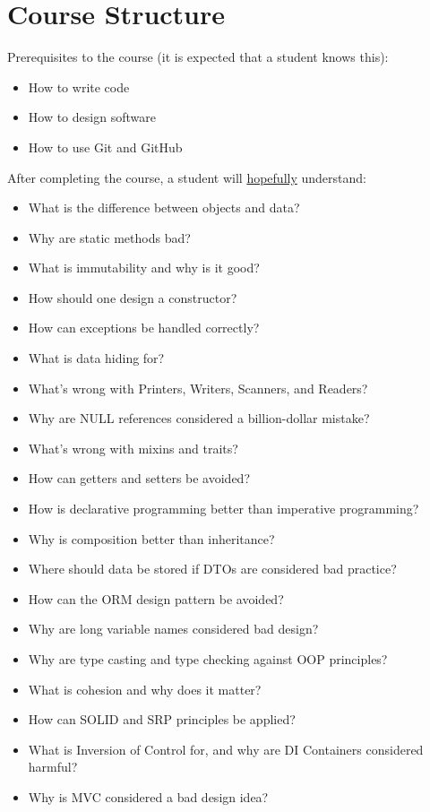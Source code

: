 \documentclass[nobrand,anonymous,nodate,nosecurity]{huawei}
\begin{document}

\newpage
\section*{Course Structure}

Prerequisites to the course (it is expected that a student knows this):

\begin{itemize}
\item How to write code
\item How to design software
\item How to use Git and GitHub
\end{itemize}

After completing the course, a student will \ul{hopefully} understand:

\begin{itemize}
\item What is the difference between objects and data?
\item Why are static methods bad?
\item What is immutability and why is it good?
\item How should one design a constructor?
\item How can exceptions be handled correctly?
\item What is data hiding for?
\item What's wrong with Printers, Writers, Scanners, and Readers?
\item Why are NULL references considered a billion-dollar mistake?
\item What's wrong with mixins and traits?
\item How can getters and setters be avoided?
\item How is declarative programming better than imperative programming?
\item Why is composition better than inheritance?
\item Where should data be stored if DTOs are considered bad practice?
\item How can the ORM design pattern be avoided?
\item Why are long variable names considered bad design?
\item Why are type casting and type checking against OOP principles?
\item What is cohesion and why does it matter?
\item How can SOLID and SRP principles be applied?
\item What is Inversion of Control for, and why are DI Containers considered harmful?
\item Why is MVC considered a bad design idea?
\end{itemize}
\end{document}
